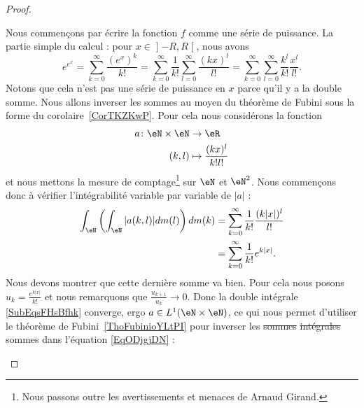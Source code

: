 \begin{proof}
\begin{enumerate}
                    Nous commençons par écrire la fonction \( f\) comme une série de puissance. La partie simple du calcul : pour \( x\in \mathopen] -R , R \mathclose[\), nous avons
                        \begin{equation}    \label{EqODjgjDN}
                        e^{e^x}=\sum_{k=0}^{\infty}\frac{ (e^x)^k }{ k! }=\sum_{k=0}^{\infty}\frac{1}{ k! }\sum_{l=0}^{\infty}\frac{ (kx)^l }{ l! }=\sum_{k=0}^{\infty}\sum_{l=0}^{\infty}\frac{k^l}{k! }\frac{ x^l }{ l! }.
                    \end{equation}
                    Notons que cela n'est pas une série de puissance en \( x\) parce qu'il y a la double somme. Nous allons inverser les sommes au moyen du théorème de Fubini sous la forme du corolaire~\ref{CorTKZKwP}. Pour cela nous considérons la fonction
                    \begin{equation}
                        \begin{aligned}
                            a\colon \eN\times \eN&\to \eR \\
                            (k,l)&\mapsto \frac{ (kx)^l }{ k!l! }
                        \end{aligned}
                    \end{equation}
                    et nous mettons la mesure de comptage\footnote{Nous passons outre les avertissements et menaces de Arnaud Girand.} sur \( \eN\) et \( \eN^2\). Nous commençons donc à vérifier l'intégrabilité variable par variable de \( | a |\) :
                    \begin{subequations}    \label{SubEqsFHsBfhk}
                        \begin{align}
                            \int_{\eN}\left( \int_{\eN}| a(k,l) |dm(l) \right)dm(k)&=\sum_{k=0}^{\infty}\frac{1}{ k! }\frac{ (k| x |)^l }{ l! }\\
                            &=\sum_{k=0}^{\infty}\frac{1}{ k! } e^{k| x |}.
                        \end{align}
                    \end{subequations}
                    Nous devons montrer que cette dernière somme va bien. Pour cela nous posons \( u_k=\frac{ e^{k| x |} }{ k! }\) et nous remarquons que \( \frac{ u_{k+1} }{ u_k }\to 0\). Donc la double intégrale \eqref{SubEqsFHsBfhk} converge, ergo \( a\in L^1(\eN\times \eN)\), ce qui nous permet d'utiliser le théorème de Fubini~\ref{ThoFubinioYLtPI} pour inverser les \sout{sommes} \sout{intégrales} sommes dans l'équation \eqref{EqODjgjDN} :

\end{enumerate}
\end{proof}
